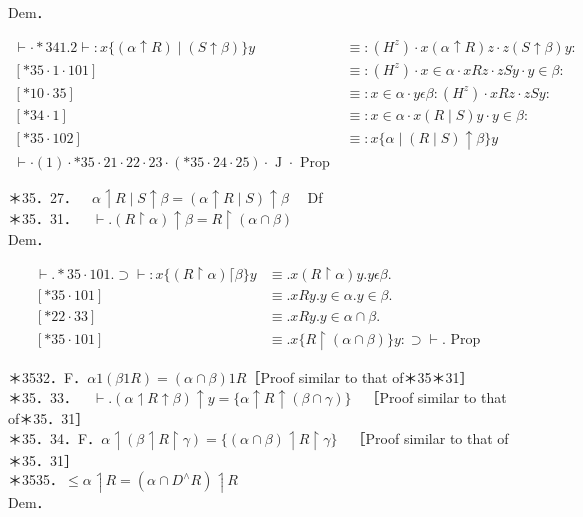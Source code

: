 \documentclass[10pt]{article}
\begin{document}
Dem．

\[
\begin{array}{ll}
\vdash \cdot * 341.2 \vdash: x\{(\alpha \uparrow R) \mid(S \uparrow \beta)\} y & \equiv:\left(H^{z}\right) \cdot x(\alpha \uparrow R) z \cdot z(S \uparrow \beta) y: \\
{[* 35 \cdot 1 \cdot 101]} & \equiv:\left(H^{z}\right) \cdot x \in \alpha \cdot x R z \cdot z S y \cdot y \in \beta: \\
{[* 10 \cdot 35]} & \equiv: x \in \alpha \cdot y \epsilon \beta:\left(H^{z}\right) \cdot x R z \cdot z S y: \\
{[* 34 \cdot 1]} & \equiv: x \in \alpha \cdot x(R \mid S) y \cdot y \in \beta: \\
{[* 35 \cdot 102]} & \equiv: x\{\alpha \mid(R \mid S) \uparrow \beta\} y  \tag{1}\\
\vdash \cdot(1) \cdot * 35 \cdot 21 \cdot 22 \cdot 23 \cdot(* 35 \cdot 24 \cdot 25) \cdot \text { J } \cdot \text { Prop }
\end{array}
\]

＊35．27．$\quad \alpha \upharpoonleft R \mid S \uparrow \beta=(\alpha \uparrow R \mid S) \uparrow \beta \quad$ Df\\
＊35．31．$\quad \vdash .(R \upharpoonright \alpha) \uparrow \beta=R \upharpoonright(\alpha \cap \beta)$\\
Dem．

$$
\begin{array}{ll}
\vdash . * 35 \cdot 101 . \supset \vdash: x\{(R \upharpoonright \alpha)\lceil\beta\} y & \equiv . x(R \upharpoonright \alpha) y . y \epsilon \beta . \\
{[* 35 \cdot 101]} & \equiv . x R y . y \in \alpha . y \in \beta . \\
{[* 22 \cdot 33]} & \equiv . x R y . y \in \alpha \cap \beta . \\
{[* 35 \cdot 101]} & \equiv . x\{R \upharpoonright(\alpha \cap \beta)\} y: \supset \vdash . \text { Prop }
\end{array}
$$

＊3532．F．$\alpha 1(\beta 1 R)=(\alpha \cap \beta) 1 R$［Proof similar to that of＊35＊31］\\
＊35．33．$\quad \vdash .(\alpha \upharpoonleft R \uparrow \beta) \uparrow y=\{\alpha \uparrow R \uparrow(\beta \cap \gamma)\} \quad$［Proof similar to that of＊35．31］\\
＊35．34．F．$\alpha \upharpoonleft(\beta \upharpoonleft R \upharpoonright \gamma)=\{(\alpha \cap \beta) \upharpoonleft R \upharpoonright \gamma\} \quad$［Proof similar to that of＊35．31］\\
＊3535．$\leqslant \alpha \upharpoonleft R=\left(\alpha \cap D^{\wedge} R\right) \upharpoonleft R$\\
Dem．
\end{document}
